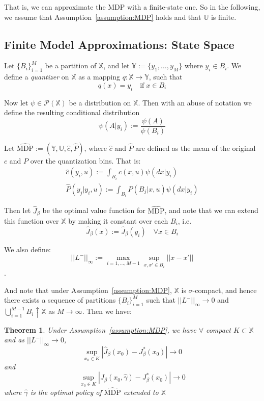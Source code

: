 \documentclass[conference]{IEEEtran}
\newtheorem{theorem}{Theorem}[section]
\begin{document}
That is, we can approximate the MDP with a finite-state one. So in the following, we assume that Assumption~\ref{assumption:MDP} holds and that \(\mathbb{U}\) is finite.

\subsection{Finite Model Approximations: State Space}
Let \(\{B_i\}_{i=1}^M\) be a partition of \(\mathbb{X}\), and let \(\mathbb{Y} := \{y_1,\ldots,y_M\}\) where \(y_i \in B_i\). We define a \emph{quantizer} on \(\mathbb{X}\) as a mapping \(q : \mathbb{X} \to \mathbb{Y}\), such that
\[ q(x) = y_i \quad \text{if} \; x \in B_i \]

Now let \(\psi \in \mathcal{P}(\mathbb{X})\) be a distribution on \(\mathbb{X}\). Then with an abuse of notation we define the resulting conditional distribution
\[\psi(A | y_i) := \frac{\psi(A)}{\psi(B_i)}\]

Let \(\hat{\text{MDP}} := (\mathbb{Y}, \mathbb{U}, \hat{c}, \hat{P})\), where \(\hat{c}\) and \(\hat{P}\) are defined as the mean of the original \(c\) and \(P\) over the quantization bins. That is:
\begin{gather} \nonumber \hat{c}(y_i,u) := \int_{B_i}c(x,u)\psi(dx | y_i) \\
    \hat{P}(y_j | y_i,u) := \int_{B_i}P(B_j | x,u)\psi(dx | y_i)\label{eq:hats}\end{gather}

Then let \(\hat{J}_\beta\) be the optimal value function for \(\hat{\text{MDP}}\), and note that we can extend this function over \(\mathbb{X}\) by making it constant over each \(B_i\), i.e.
\[ \hat{J}_\beta(x) := \hat{J}_\beta(y_i) \quad \forall x \in B_i \]

We also define:
\[ ||L^-||_\infty := \max_{i=1,\ldots,M-1} \sup_{x,x' \in B_i}||x-x'||\].

And note that under Assumption~\ref{assumption:MDP}, \(\mathbb{X}\) is \(\sigma\)-compact, and hence there exists a sequence of partitions \(\{B_i\}_{i=1}^M\) such that \(||L^-||_\infty \to 0\) and \(\bigcup_{i=1}^{M-1}B_i \uparrow \mathbb{X}\) as \(M \to \infty\). Then we have:

\begin{theorem}\label{theorem:2.3}\cite[Theorem 4.27]{Quantized_Models}
    Under Assumption~\ref{assumption:MDP}, we have \(\forall\) compact \(K \subset \mathbb{X}\) and as \(||L^-||_\infty \to 0\),
    \[ \sup_{x_0 \in K}|\hat{J}_\beta(x_0) - J^*_\beta(x_0)| \to 0 \]
    and
    \[ \sup_{x_0 \in K}|J_\beta(x_0,\hat{\gamma}) - J^*_\beta(x_0)| \to 0 \]
    where \(\hat{\gamma}\) is the optimal policy of \(\hat{\text{MDP}}\) extended to \(\mathbb{X}\)
\end{theorem}
\end{document}
